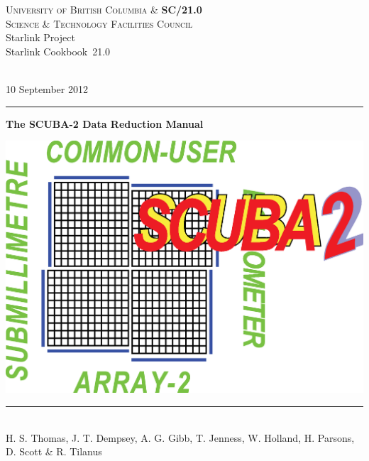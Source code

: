 \documentclass[twoside,11pt]{article}
\newcommand{\stardoccategory}  {Starlink Cookbook}
\newcommand{\stardocinitials}  {SC}
\newcommand{\stardocnumber}    {21.0}
\newcommand{\stardocauthors}   {H. S. Thomas, J. T. Dempsey, A. G. Gibb, T. Jenness, W. Holland, H. Parsons, D. Scott \& R. Tilanus}
\newcommand{\stardoceditor}    {Editor: H. S. Thomas}
\newcommand{\stardocdate}      {10 September 2012}
\newcommand{\stardoctitle}     {The SCUBA-2 Data Reduction Manual}
\newcommand{\stardocversion}   {1.1}
\newcommand{\stardocname}{\stardocinitials /\stardocnumber}
\newenvironment{latexonly}{}{}
\renewcommand{\_}{\texttt{\symbol{95}}}
\begin{document}
\thispagestyle{empty}

\begin{latexonly}
   \textsc{University of British Columbia \&} \hfill \textbf{\stardocname}\\
   {\textsc{Science \& Technology Facilities Council}}\\
   {\large Starlink Project\\}
   {\large \stardoccategory\ \stardocnumber\\}\\
   \begin{flushright}
 \vspace{-4mm}
   \stardocdate\\
   \end{flushright}
   \vspace{-4mm}
   \rule{\textwidth}{0.5mm}
   \vspace{5mm}
   \begin{center}
   {\Huge\textbf{\stardoctitle \\ [2.5ex]}}
 \vspace{5mm}
\begin{center}
\includegraphics[scale=0.4]{s2logo}
\end{center}
 \vspace{5mm}
   \rule{\textwidth}{0.5mm}\\
   \vspace{5mm}
   \stardocauthors\\
  \vspace{10mm}
   \end{center}
   \vspace{5mm}


\end{latexonly}
\end{document}
